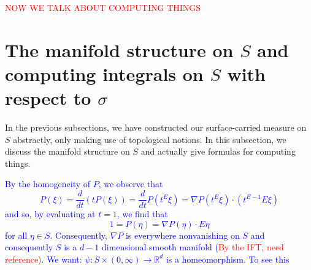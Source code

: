 \documentclass[11pt]{article}
\theoremstyle{theorem}
\begin{document}
\textcolor{red}{NOW WE TALK ABOUT COMPUTING THINGS}

\section{The manifold structure on $S$ and computing integrals on $S$ with respect to $\sigma$}
In the previous subsections, we have constructed our surface-carried measure on $S$ abstractly, only making use of topological notions. In this subsection, we discuss the manifold structure on $S$ and actually give formulas for computing things.

\textcolor{blue}{
By the homogeneity of $P$, we observe that
\begin{equation*}
P(\xi)=\frac{d}{dt}(tP(\xi))=\frac{d}{dt}P(t^E\xi)=\nabla P(t^E\xi)\cdot (t^{E-1}E\xi)
\end{equation*}
and so, by evaluating at $t=1$, we find that
\begin{equation*}
1=P(\eta)=\nabla P(\eta)\cdot E\eta
\end{equation*}
for all $\eta\in S$. Consequently, $\nabla P$ is everywhere nonvanishing on $S$ and consequently $S$ is a $d-1$ dimensional smooth manifold (\textcolor{red}{By the IFT, need reference)}.  We want: $\psi: S\times (0,\infty)\to\mathbb{R}^d$ is a homeomorphism. To see this}
\end{document}
